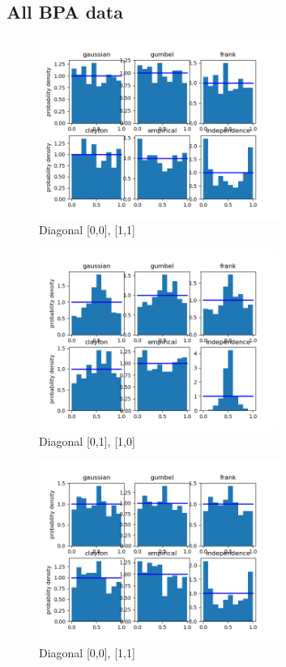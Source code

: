 \clearpage

\subsection{All BPA data}



\begin{figure}[h]
	\centering
	\includegraphics[width=0.7\textwidth]{2016-04-03_15_00-2016-04-03_16_00-0.png}
	\caption{Diagonal [0,0], [1,1]}
\end{figure}

\begin{figure}[h]
	\centering
	\includegraphics[width=0.7\textwidth]{2016-04-03_15_00-2016-04-03_16_00-1.png}
	\caption{Diagonal [0,1], [1,0]}
\end{figure}



\begin{figure}[h]
	\centering
	\includegraphics[width=0.7\textwidth]{2016-07-18_02_00-2016-07-18_03_00-0.png}
	\caption{Diagonal [0,0], [1,1]}
\end{figure}

